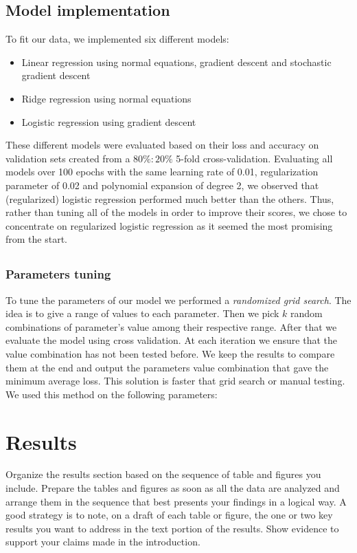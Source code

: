 \documentclass[10pt,conference,compsocconf]{IEEEtran}
\begin{document}
    \subsection{Model implementation}
    To fit our data, we implemented six different models: 
    \begin{itemize}
        \item Linear regression using normal equations, gradient descent and stochastic gradient descent 
        \item Ridge regression using normal equations
        \item Logistic regression using gradient descent 
    \end{itemize}
    These different models were evaluated based on their loss and accuracy on validation sets created from a $80\%:20\%$ 5-fold cross-validation. Evaluating all models over 100 epochs with the same learning rate of 0.01, regularization parameter of 0.02 and polynomial expansion of degree 2, we observed that (regularized) logistic regression performed much better than the others. Thus, rather than tuning all of the models in order to improve their scores, we chose to concentrate on regularized logistic regression as it seemed the most promising from the start. 
    

    \subsection{}
        \subsubsection{Parameters tuning}
            To tune the parameters of our model we performed a \textit{randomized grid search}. The idea is to give a range of values to each parameter. Then we pick $k$ random combinations of parameter's value among their respective range. After that we evaluate the model using cross validation. At each iteration we ensure that the value combination has not been tested before. We keep the results to compare them at the end and output the parameters value combination that gave the minimum average loss. This solution is faster that grid search or manual testing. We used this method on the following parameters: 
\section{Results}\label{sec: results}
    Organize the results section based on the sequence of table and
    figures you include. Prepare the tables and figures as soon as all
    the data are analyzed and arrange them in the sequence that best
    presents your findings in a logical way. A good strategy is to note,
    on a draft of each table or figure, the one or two key results you
    want to address in the text portion of the results.
    Show evidence to support your claims made in the
    introduction.
\end{document}
